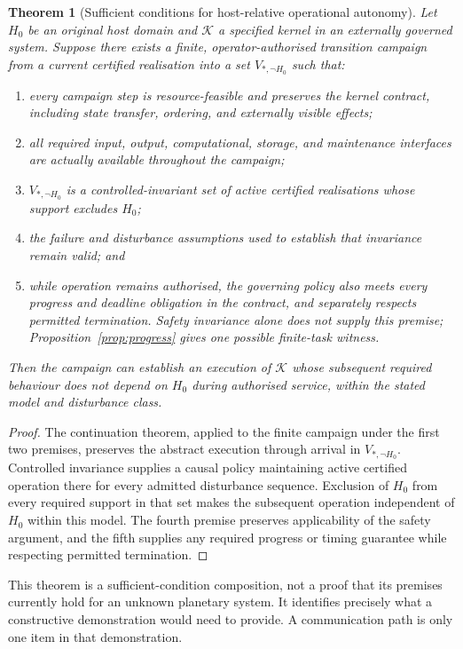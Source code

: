 \documentclass[11pt,a4paper]{article}
\newtheorem{theorem}{Theorem}[section]
\theoremstyle{definition}
\theoremstyle{remark}
\newcommand{\calK}{\mathcal{K}}
\begin{document}
\begin{theorem}[Sufficient conditions for host-relative operational autonomy]\label{thm:autonomy}
Let $H_0$ be an original host domain and $\calK$ a specified kernel in an externally governed system. Suppose there exists a finite, operator-authorised transition campaign from a current certified realisation into a set $V_{*,\neg H_0}$ such that:
\begin{enumerate}
 \item every campaign step is resource-feasible and preserves the kernel contract, including state transfer, ordering, and externally visible effects;
 \item all required input, output, computational, storage, and maintenance interfaces are actually available throughout the campaign;
 \item $V_{*,\neg H_0}$ is a controlled-invariant set of active certified realisations whose support excludes $H_0$;
 \item the failure and disturbance assumptions used to establish that invariance remain valid; and
 \item while operation remains authorised, the governing policy also meets every progress and deadline obligation in the contract, and separately respects permitted termination. Safety invariance alone does not supply this premise; Proposition~\ref{prop:progress} gives one possible finite-task witness.
\end{enumerate}
Then the campaign can establish an execution of $\calK$ whose subsequent required behaviour does not depend on $H_0$ during authorised service, within the stated model and disturbance class.
\end{theorem}
\begin{proof}
The continuation theorem, applied to the finite campaign under the first two premises, preserves the abstract execution through arrival in $V_{*,\neg H_0}$. Controlled invariance supplies a causal policy maintaining active certified operation there for every admitted disturbance sequence. Exclusion of $H_0$ from every required support in that set makes the subsequent operation independent of $H_0$ within this model. The fourth premise preserves applicability of the safety argument, and the fifth supplies any required progress or timing guarantee while respecting permitted termination.
\end{proof}
This theorem is a sufficient-condition composition, not a proof that its premises currently hold for an unknown planetary system. It identifies precisely what a constructive demonstration would need to provide. A communication path is only one item in that demonstration.
\end{document}
